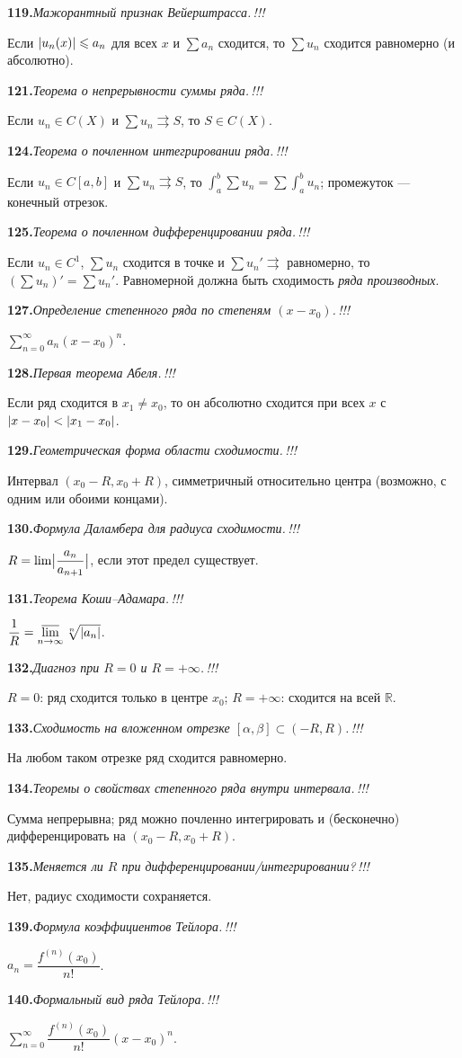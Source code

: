 \documentclass[10pt,a4paper]{article}
\newcommand{\R}{\mathbb{R}}
\renewcommand{\le}{\leqslant}
\DeclarePairedDelimiter{\abs}{\lvert}{\rvert}
\theoremstyle{definition}
\theoremstyle{plain}
\newcommand{\writespace}{\vspace{7.5mm}}
\newcommand{\tm}{\textcolor{teormin}{\,!!!}}
\newcommand{\faq}[3]{%
  \par\smallskip\noindent
  \textbf{#1.}\enspace\textit{#2}\par
  \nobreak\vspace{0.3ex}\noindent #3\par
  \writespace}
\begin{document}
\faq{119}{Мажорантный признак Вейерштрасса.\tm}{%
Если $\abs{u_n(x)}\le a_n$ для всех $x$ и $\sum a_n$ сходится, то $\sum u_n$ сходится равномерно (и
абсолютно).}

\faq{121}{Теорема о непрерывности суммы ряда.\tm}{%
Если $u_n\in C(X)$ и $\sum u_n\rightrightarrows S$, то $S\in C(X)$.}

\faq{124}{Теорема о почленном интегрировании ряда.\tm}{%
Если $u_n\in C[a,b]$ и $\sum u_n\rightrightarrows S$, то $\int_a^b\sum u_n=\sum\int_a^b u_n$;
промежуток — конечный отрезок.}

\faq{125}{Теорема о почленном дифференцировании ряда.\tm}{%
Если $u_n\in C^1$, $\sum u_n$ сходится в точке и $\sum u_n'\rightrightarrows$ равномерно, то
$(\sum u_n)'=\sum u_n'$. Равномерной должна быть сходимость \emph{ряда производных}.}

\faq{127}{Определение степенного ряда по степеням $(x-x_0)$.\tm}{%
$\sum_{n=0}^\infty a_n(x-x_0)^n$.}

\faq{128}{Первая теорема Абеля.\tm}{%
Если ряд сходится в $x_1\ne x_0$, то он абсолютно сходится при всех $x$ с $\abs{x-x_0}<\abs{x_1-x_0}$.}

\faq{129}{Геометрическая форма области сходимости.\tm}{%
Интервал $(x_0-R,x_0+R)$, симметричный относительно центра (возможно, с одним или обоими концами).}

\faq{130}{Формула Даламбера для радиуса сходимости.\tm}{%
$R=\lim\abs[\big]{\dfrac{a_n}{a_{n+1}}}$, если этот предел существует.}

\faq{131}{Теорема Коши–Адамара.\tm}{%
$\dfrac1R=\varlimsup\limits_{n\to\infty}\sqrt[n]{\abs{a_n}}$.}

\faq{132}{Диагноз при $R=0$ и $R=+\infty$.\tm}{%
$R=0$: ряд сходится только в центре $x_0$; $R=+\infty$: сходится на всей $\R$.}

\faq{133}{Сходимость на вложенном отрезке $[\alpha,\beta]\subset(-R,R)$.\tm}{%
На любом таком отрезке ряд сходится равномерно.}

\faq{134}{Теоремы о свойствах степенного ряда внутри интервала.\tm}{%
Сумма непрерывна; ряд можно почленно интегрировать и (бесконечно) дифференцировать на
$(x_0-R,x_0+R)$.}

\faq{135}{Меняется ли $R$ при дифференцировании/интегрировании?\tm}{%
Нет, радиус сходимости сохраняется.}

\faq{139}{Формула коэффициентов Тейлора.\tm}{%
$a_n=\dfrac{f^{(n)}(x_0)}{n!}$.}

\faq{140}{Формальный вид ряда Тейлора.\tm}{%
$\sum_{n=0}^\infty\dfrac{f^{(n)}(x_0)}{n!}(x-x_0)^n$.}
\end{document}

